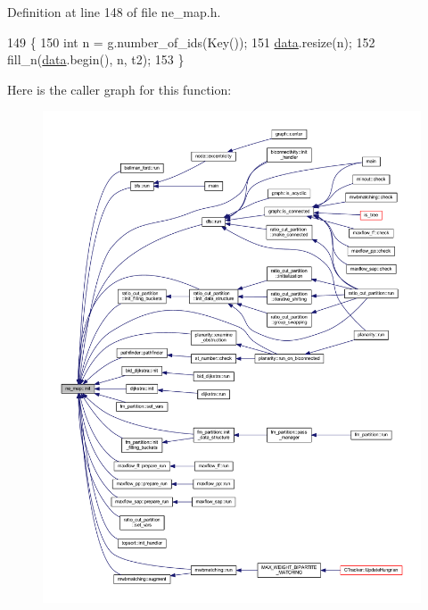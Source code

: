Definition at line 148 of file ne\+\_\+map.\+h.


\begin{DoxyCode}
149 \{
150     \textcolor{keywordtype}{int} n = \mbox{\hyperlink{rings_8cpp_aa9df5aa3976a89a96a5f1c7611d42938}{g}}.number\_of\_ids(Key());
151     \mbox{\hyperlink{classne__map_af73307678e05a9c24c084d98b267afa8}{data}}.resize(n);
152     fill\_n(\mbox{\hyperlink{classne__map_af73307678e05a9c24c084d98b267afa8}{data}}.begin(), n, t2);
153 \}
\end{DoxyCode}
Here is the caller graph for this function\+:\nopagebreak
\begin{figure}[H]
\begin{center}
\leavevmode
\includegraphics[width=350pt]{classne__map_a4ef2ab4aebcb57a7a101975bf6a88e24_icgraph}
\end{center}
\end{figure}
\mbox{\label{classne__map_a4bcfa7ec2dcbfaa42fab93dfa81e8ab0}} 
